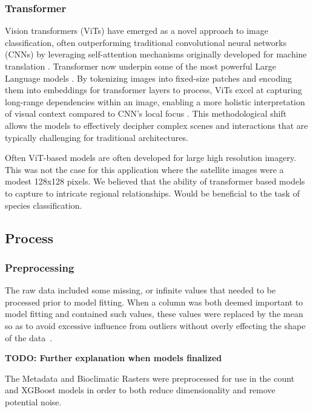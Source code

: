 \subsubsection{Transformer}
Vision transformers (ViTs) have emerged as a novel approach to image classification, often outperforming traditional convolutional neural networks (CNNs) by leveraging self-attention mechanisms originally developed for machine translation \cite{vaswani2017attention}. Transformer now underpin some of the most powerful Large Language models \cite{brown2020language}. By tokenizing images into fixed-size patches and encoding them into embeddings for transformer layers to process, ViTs excel at capturing long-range dependencies within an image, enabling a more holistic interpretation of visual context compared to CNN's local focus \cite{dosovitskiy2021image}. This methodological shift allows the models to effectively decipher complex scenes and interactions that are typically challenging for traditional architectures.

Often ViT-based models are often developed for large high resolution imagery. This was not the case for this application where the satellite images were a modest 128x128 pixels. We believed that the ability of transformer based models to capture to intricate regional relationships. Would be beneficial to the task of species classification.

\subsection{Process}

\subsubsection{Preprocessing}

The raw data included some missing, or infinite values that needed to be processed prior to model fitting. When a column was both deemed important to model fitting and contained such values, these values were replaced by the mean so as to avoid excessive influence from outliers without overly effecting the shape of the data~\cite{missingmedian}.

\textbf{TODO: Further explanation when models finalized}

The Metadata and Bioclimatic Rasters were preprocessed for use in the count and XGBoost models in order to both reduce dimensionality and remove potential noise.




